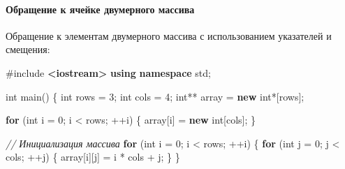\documentclass[
]{article}
\newenvironment{Shaded}{}{}
\newcommand{\CommentTok}[1]{\textcolor[rgb]{0.38,0.63,0.69}{\textit{#1}}}
\newcommand{\ControlFlowTok}[1]{\textcolor[rgb]{0.00,0.44,0.13}{\textbf{#1}}}
\newcommand{\DataTypeTok}[1]{\textcolor[rgb]{0.56,0.13,0.00}{#1}}
\newcommand{\DecValTok}[1]{\textcolor[rgb]{0.25,0.63,0.44}{#1}}
\newcommand{\ImportTok}[1]{\textcolor[rgb]{0.00,0.50,0.00}{\textbf{#1}}}
\newcommand{\KeywordTok}[1]{\textcolor[rgb]{0.00,0.44,0.13}{\textbf{#1}}}
\newcommand{\NormalTok}[1]{#1}
\newcommand{\OperatorTok}[1]{\textcolor[rgb]{0.40,0.40,0.40}{#1}}
\newcommand{\PreprocessorTok}[1]{\textcolor[rgb]{0.74,0.48,0.00}{#1}}
\begin{document}
\paragraph{Обращение к ячейке двумерного
массива}\label{ux43eux431ux440ux430ux449ux435ux43dux438ux435-ux43a-ux44fux447ux435ux439ux43aux435-ux434ux432ux443ux43cux435ux440ux43dux43eux433ux43e-ux43cux430ux441ux441ux438ux432ux430}

Обращение к элементам двумерного массива с использованием указателей и
смещения:

\begin{Shaded}
\begin{Highlighting}[]
\PreprocessorTok{\#include }\ImportTok{\textless{}iostream\textgreater{}}
\KeywordTok{using} \KeywordTok{namespace}\NormalTok{ std}\OperatorTok{;}

\DataTypeTok{int}\NormalTok{ main}\OperatorTok{()} \OperatorTok{\{}
    \DataTypeTok{int}\NormalTok{ rows }\OperatorTok{=} \DecValTok{3}\OperatorTok{;}
    \DataTypeTok{int}\NormalTok{ cols }\OperatorTok{=} \DecValTok{4}\OperatorTok{;}
    \DataTypeTok{int}\OperatorTok{**}\NormalTok{ array }\OperatorTok{=} \KeywordTok{new} \DataTypeTok{int}\OperatorTok{*[}\NormalTok{rows}\OperatorTok{];}

    \ControlFlowTok{for} \OperatorTok{(}\DataTypeTok{int}\NormalTok{ i }\OperatorTok{=} \DecValTok{0}\OperatorTok{;}\NormalTok{ i }\OperatorTok{\textless{}}\NormalTok{ rows}\OperatorTok{;} \OperatorTok{++}\NormalTok{i}\OperatorTok{)} \OperatorTok{\{}
\NormalTok{        array}\OperatorTok{[}\NormalTok{i}\OperatorTok{]} \OperatorTok{=} \KeywordTok{new} \DataTypeTok{int}\OperatorTok{[}\NormalTok{cols}\OperatorTok{];}
    \OperatorTok{\}}

    \CommentTok{// Инициализация массива}
    \ControlFlowTok{for} \OperatorTok{(}\DataTypeTok{int}\NormalTok{ i }\OperatorTok{=} \DecValTok{0}\OperatorTok{;}\NormalTok{ i }\OperatorTok{\textless{}}\NormalTok{ rows}\OperatorTok{;} \OperatorTok{++}\NormalTok{i}\OperatorTok{)} \OperatorTok{\{}
        \ControlFlowTok{for} \OperatorTok{(}\DataTypeTok{int}\NormalTok{ j }\OperatorTok{=} \DecValTok{0}\OperatorTok{;}\NormalTok{ j }\OperatorTok{\textless{}}\NormalTok{ cols}\OperatorTok{;} \OperatorTok{++}\NormalTok{j}\OperatorTok{)} \OperatorTok{\{}
\NormalTok{            array}\OperatorTok{[}\NormalTok{i}\OperatorTok{][}\NormalTok{j}\OperatorTok{]} \OperatorTok{=}\NormalTok{ i }\OperatorTok{*}\NormalTok{ cols }\OperatorTok{+}\NormalTok{ j}\OperatorTok{;}
        \OperatorTok{\}}
    \OperatorTok{\}}


\end{Highlighting}
\end{Shaded}
\end{document}
